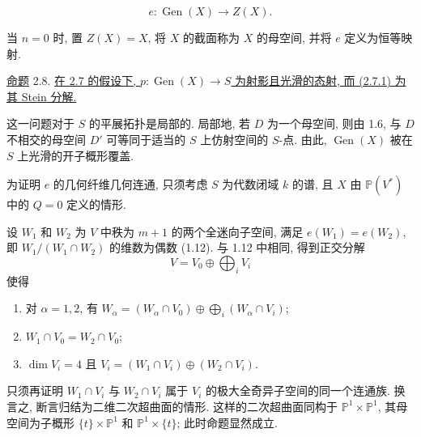 \begin{equation}\tag{2.7.1}
e:\operatorname{Gen}(X)\longrightarrow Z(X).
\end{equation}

当 $n=0$ 时, 置 $Z(X)=X$, 将 $X$ 的截面称为 $X$ 的母空间, 并将 $e$ 定义为恒等映射.


\underline{命题} 2.8. \underline{在 2.7 的假设下, $p:\operatorname{Gen}(X)\longrightarrow S$ 为射影且光滑的态射, 而 (2.7.1) 为其 Stein 分解.}

这一问题对于 $S$ 的平展拓扑是局部的. 局部地, 若 $D$ 为一个母空间, 则由 1.6, 与 $D$ 不相交的母空间 $D'$ 可等同于适当的 $S$ 上仿射空间的 $S$-点. 由此, $\operatorname{Gen}(X)$ 被在 $S$ 上光滑的开子概形覆盖.

为证明 $e$ 的几何纤维几何连通, 只须考虑 $S$ 为代数闭域 $k$ 的谱, 且 $X$ 由 $\mathbb P(V^*)$ 中的 $Q=0$ 定义的情形.

设 $W_1$ 和 $W_2$ 为 $V$ 中秩为 $m+1$ 的两个全迷向子空间, 满足 $e(W_1)=e(W_2)$, 即 $W_1/(W_1\cap W_2)$ 的维数为偶数 (1.12). 与 1.12 中相同, 得到正交分解
\begin{equation*}
V=V_0\oplus\bigoplus_i V_i
\end{equation*}
使得
\begin{enumerate}[label=\alph*),leftmargin=2.5em]
\item 对 $\alpha=1,2$, 有 $W_\alpha=(W_\alpha\cap V_0)\oplus
  \displaystyle\bigoplus_i(W_\alpha\cap V_i)$;
\item $W_1\cap V_0=W_2\cap V_0$;
\item $\dim V_i=4$ 且
  $V_i=(W_1\cap V_i)\oplus(W_2\cap V_i)$.
\end{enumerate}
只须再证明 $W_1\cap V_i$ 与 $W_2\cap V_i$ 属于 $V_i$ 的极大全奇异子空间的同一个连通族. 换言之, 断言归结为二维二次超曲面的情形. 这样的二次超曲面同构于 $\mathbb P^1\times\mathbb P^1$, 其母空间为子概形 $\{t\}\times\mathbb P^1$ 和 $\mathbb P^1\times\{t\}$; 此时命题显然成立.
